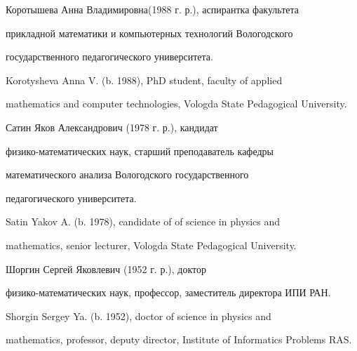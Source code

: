 \medskip


\medskip








Коротышева Анна Владимировна(1988 г. р.), аспирантка факультета


прикладной математики и компьютерных технологий Вологодского


государственного педагогического университета.





Korotysheva Anna V. (b. 1988), PhD student, faculty of applied


mathematics and computer technologies, Vologda State Pedagogical University.








\medskip








Сатин Яков Александрович (1978 г. р.), кандидат


физико-математических наук, старший преподаватель кафедры


математического анализа Вологодского государственного


педагогического университета.





Satin Yakov A. (b. 1978), candidate of of science in physics and


mathematics, senior lecturer, Vologda State Pedagogical University.








\medskip


Шоргин Сергей Яковлевич (1952 г. р.), доктор


физико-математических наук, профессор, заместитель директора ИПИ РАН.








Shorgin Sergey Ya. (b. 1952), doctor of science in physics and


mathematics, professor, deputy director, Institute of Informatics Problems RAS.


